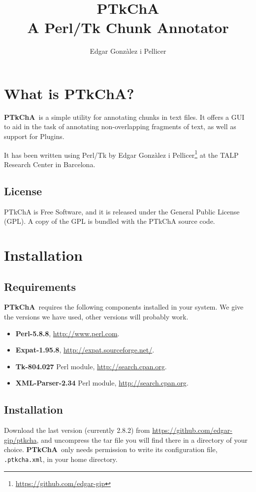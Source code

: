 \documentclass{article}
\title{PTkChA\\A Perl/Tk Chunk Annotator}
\author{Edgar Gonzàlez i Pellicer}
\date{}
\newcommand{\ptkcha}{\textbf{PTkChA}}
\begin{document}
\maketitle

\tableofcontents

\newpage

\section{What is PTkChA?}
\ptkcha\ is a simple utility for annotating chunks in text
files. It offers a GUI to aid in the task of annotating
non-overlapping fragments of text, as well as support for Plugins.

It has been written using Perl/Tk by Edgar Gonzàlez i
Pellicer\footnote{\url{https://github.com/edgar-gip}} at the TALP
Research Center in Barcelona.

\subsection{License}
PTkChA is Free Software, and it is released under the General Public
License (GPL). A copy of the GPL is bundled with the PTkChA source code.

\section{Installation}
\subsection{Requirements}
\ptkcha\ requires the following components installed in your
system. We give the versions we have used, other versions will
probably work.

\begin{itemize}
\item \textbf{Perl-5.8.8}, \url{http://www.perl.com}.
\item \textbf{Expat-1.95.8}, \url{http://expat.sourceforge.net/}.
\item \textbf{Tk-804.027} Perl module, \url{http://search.cpan.org}.
\item \textbf{XML-Parser-2.34} Perl module, \url{http://search.cpan.org}.
\end{itemize}

\subsection{Installation}
Download the last version (currently 2.8.2) from
\url{https://github.com/edgar-gip/ptkcha}, and uncompress
the tar file you will find there in a directory of your
choice. \ptkcha\ only needs permission to write its configuration
file, \texttt{.ptkcha.xml}, in your home directory.
\end{document}
